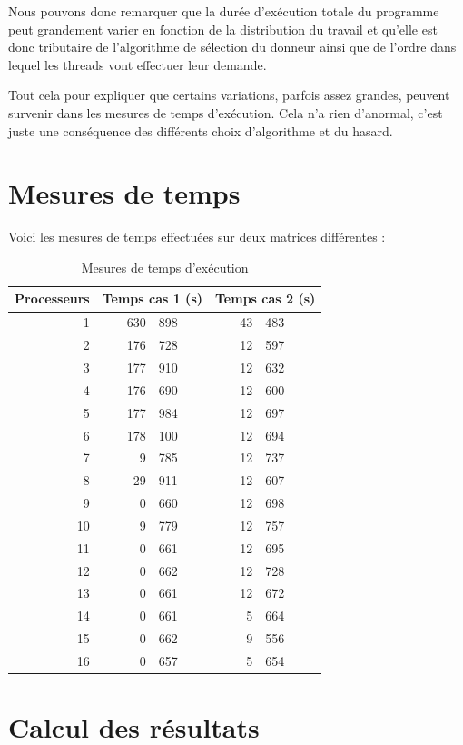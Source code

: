 \documentclass[a4paper,11pt]{report}
\begin{document}
Nous pouvons donc remarquer que la durée d'exécution totale du programme peut
grandement varier en fonction de la distribution du travail et qu'elle est
donc tributaire de l'algorithme de sélection du donneur ainsi que de l'ordre
dans lequel les threads vont effectuer leur demande.

Tout cela pour expliquer que certains variations, parfois assez grandes,
peuvent survenir dans les mesures de temps d'exécution. Cela n'a rien
d'anormal, c'est juste une conséquence des différents choix d'algorithme et
du hasard.

\section{Mesures de temps}

\noindent
Voici les mesures de temps effectuées sur deux matrices différentes :

\begin{table}[!htb]
  \centering
  \begin{tabular}{|r|r@{,}l|r@{,}l|}
    \hline
    \textbf{Processeurs} &
    \multicolumn{2}{c|}{\textbf{Temps cas 1 (s)}} &
    \multicolumn{2}{c|}{\textbf{Temps cas 2 (s)}}\\
    \hline\hline
     1 & 630&898 & 43&483\\
     2 & 176&728 & 12&597\\
     3 & 177&910 & 12&632\\
     4 & 176&690 & 12&600\\
     5 & 177&984 & 12&697\\
     6 & 178&100 & 12&694\\
     7 &   9&785 & 12&737\\
     8 &  29&911 & 12&607\\
     9 &   0&660 & 12&698\\
    10 &   9&779 & 12&757\\
    11 &   0&661 & 12&695\\
    12 &   0&662 & 12&728\\
    13 &   0&661 & 12&672\\
    14 &   0&661 &  5&664\\
    15 &   0&662 &  9&556\\
    16 &   0&657 &  5&654\\
    \hline
  \end{tabular}
  \caption{Mesures de temps d'exécution}
\end{table}

\section{Calcul des résultats}
\end{document}
